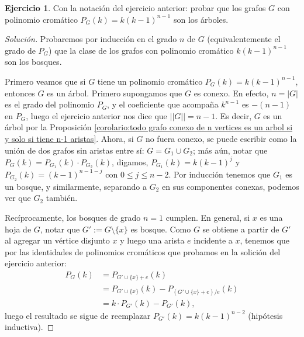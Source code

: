 \documentclass[12pt]{report}
\theoremstyle{plain}
\theoremstyle{definition}
\newtheorem{exercise}[theorem]{Ejercicio}
\newenvironment{solution}{\begin{proof}[Solución]}{\end{proof}}
\newcommand{\abs}[1]{\left \vert #1 \right \vert}
\newcommand{\Abs}[1]{\left \vert \left \vert #1 \right \vert \right \vert}
\begin{document}
\begin{exercise}
Con la notación del ejercicio anterior: probar que los grafos $G$ con polinomio cromático $P_G (k) = k (k-1)^{n-1}$ son los árboles.
\end{exercise}
\begin{solution}
Probaremos por inducción en el grado $n$ de $G$ (equivalentemente el grado de $P_G$) que la clase de los grafos con polinomio cromático $k(k-1)^{n-1}$ son los bosques.

Primero veamos que si $G$ tiene un polinomio cromático $P_G (k) = k(k-1)^{n-1}$, entonces $G$ es un árbol. Primero supongamos que $G$ es conexo. En efecto, $n = \abs G$ es el grado del polinomio $P_G$, y el coeficiente que acompaña $k^{n-1}$ es $-(n-1)$ en $P_G$, luego el ejercicio anterior nos dice que $\Abs G = n-1$. Es decir, $G$ es un árbol por la Proposición \ref{corolario:todo grafo conexo de n vertices es un arbol si y solo si tiene n-1 aristas}. Ahora, si $G$ no fuera conexo, se puede escribir como la unión de dos grafos sin aristas entre sí: $G = G_1 \cup G_2$; más aún, notar que $P_G (k) = P_{G_1} (k) \cdot P_{G_2} (k)$, digamos, $P_{G_1} (k) = k(k-1)^j$ y $P_{G_2} (k) = (k-1)^{n-1 - j}$ con $0 \leq j \leq n-2$. Por inducción tenemos que $G_1$ es un bosque, y similarmente, separando a $G_2$ en sus componentes conexas, podemos ver que $G_2$ también.

Recíprocamente, los bosques de grado $n =1$ cumplen. En general, si $x$ es una hoja de $G$, notar que $G' := G \setminus \{x\}$ es bosque. Como $G$ se obtiene a partir de $G'$ al agregar un vértice disjunto $x$ y luego una arista $e$ incidente a $x$, tenemos que por las identidades de polinomios cromáticos que probamos en la solición del ejercicio anterior:
\begin{align*}
P_G (k) &= P_{G' \cup \{x\} + e} (k) \\
        &= P_{G' \cup \{x \}} (k) - P_{(G' \cup \{x \} + e)/e} (k) \\
        &= k \cdot P_{G'} (k) - P_{G'} (k),
\end{align*}
luego el resultado se sigue de reemplazar $P_{G'} (k) = k (k-1)^{n-2}$ (hipótesis inductiva).
\end{solution}
\end{document}

